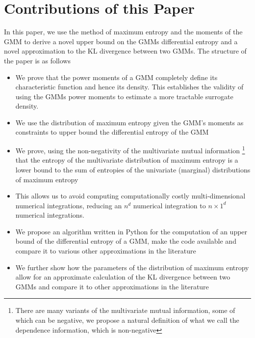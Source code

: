 \documentclass[journal]{IEEEtran}
\begin{document}
	\section{Contributions of this Paper}
In this paper, we use the method of maximum entropy and the moments of the GMM to derive a novel upper bound on the GMMs differential entropy and a novel approximation to the KL divergence between two GMMs. The structure of the paper is as follows
\begin{itemize}
\item We prove that the power moments of a GMM completely define its characteristic function and hence its density. This establishes the validity of using the GMMs power moments to estimate a more tractable surrogate density. 
\item We use the distribution of maximum entropy given the GMM's moments as constraints to upper bound the differential entropy of the GMM
\item We prove, using the non-negativity of the multivariate mutual information \footnote{There are many variants of the multivariate mutual information, some of which can be negative, we propose a natural definition of what we call the dependence information, which is non-negative} that the entropy of the multivariate distribution of maximum entropy is a lower bound to the sum of entropies of the univariate (marginal) distributions of maximum entropy
\item This allows us to avoid computing computationally costly multi-dimensional numerical integrations, reducing an $n^{d}$ numerical integration to $n\times 1^{d}$ numerical integrations.
\item We propose an algorithm written in Python for the computation of an upper bound of the differential entropy of a GMM, make the code available and compare it to various other approximations in the literature
\item We further show how the parameters of the distribution of maximum entropy allow for an approximate calculation of the KL divergence between two GMMs and compare it to other approximations in the literature
\end{itemize}
\end{document}
